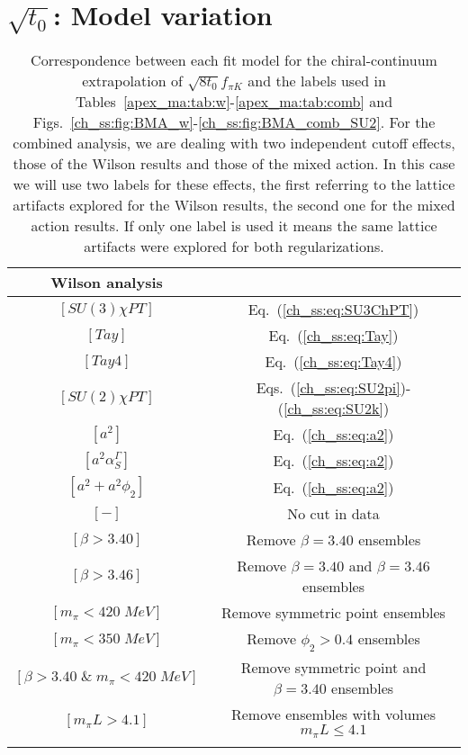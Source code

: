 
\chapter{$\sqrt{t_0}$: Model variation}
\label{apex_model_av_t0}


\begin{longtable}{c | c}
\label{apex_ma:tab:labels}
Wilson analysis \\
\toprule
$[SU(3)\chi PT]$ & Eq.~(\ref{ch_ss:eq:SU3ChPT}) \\
$[Tay]$ & Eq.~(\ref{ch_ss:eq:Tay}) \\
$[Tay4]$ & Eq.~(\ref{ch_ss:eq:Tay4}) \\
$[SU(2)\chi PT]$ & Eqs.~(\ref{ch_ss:eq:SU2pi})-(\ref{ch_ss:eq:SU2k}) \\
\midrule
$[a^2]$ & Eq.~(\ref{ch_ss:eq:a2}) \\
$[a^2\alpha_S^{\Gamma}]$ & Eq.~(\ref{ch_ss:eq:a2}) \\
$[a^2+a^2\phi_2]$ & Eq.~(\ref{ch_ss:eq:a2}) \\
\midrule
$[-]$ & No cut in data \\
$[\beta>3.40]$ & Remove $\beta=3.40$ ensembles \\
$[\beta>3.46]$ & Remove $\beta=3.40$ and $\beta=3.46$ ensembles \\
$[m_{\pi}<420\;MeV]$ & Remove symmetric point ensembles \\
$[m_{\pi}<350\;MeV]$ & Remove $\phi_2>0.4$ ensembles \\
$[\beta>3.40\;\&\;m_{\pi}<420\;MeV]$ & Remove symmetric point and $\beta=3.40$ ensembles \\
$[m_{\pi}L>4.1]$ & Remove ensembles with volumes $m_{\pi}L\leq4.1$ \\
\bottomrule
\caption{Correspondence between each fit model for the chiral-continuum extrapolation of $\sqrt{8t_0}f_{\pi K}$ and the labels used in Tables~\ref{apex_ma:tab:w}-\ref{apex_ma:tab:comb} and Figs.~\ref{ch_ss:fig:BMA_w}-\ref{ch_ss:fig:BMA_comb_SU2}. For the combined analysis, we are dealing with two independent cutoff effects, those of the Wilson results and those of the mixed action. In this case we will use two labels for these effects, the first referring to the lattice artifacts explored for the Wilson results, the second one for the mixed action results. If only one label is used it means the same lattice artifacts were explored for both regularizations.}
\end{longtable}

